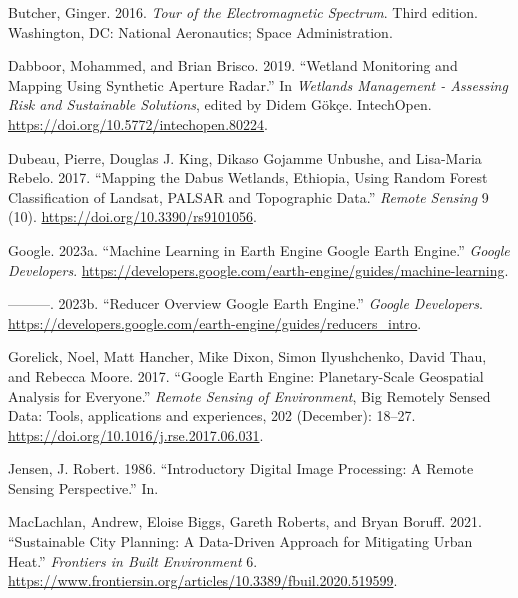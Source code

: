 \documentclass[
  letterpaper,
  DIV=11,
  numbers=noendperiod]{scrreprt}
\newlength{\cslhangindent}
\newlength{\cslentryspacingunit} %
\newenvironment{CSLReferences}[2] %
 {%
  \setlength{\parindent}{0pt}
  \ifodd #1
  \let\oldpar\par
  \def\par{\hangindent=\cslhangindent\oldpar}
  \fi
  \setlength{\parskip}{#2\cslentryspacingunit}
 }%
 {}
\begin{document}
\hypertarget{refs}{}
\begin{CSLReferences}{1}{0}
\leavevmode{}%
Butcher, Ginger. 2016. \emph{Tour of the Electromagnetic Spectrum}.
Third edition. Washington, DC: National Aeronautics; Space
Administration.

\leavevmode{}%
Dabboor, Mohammed, and Brian Brisco. 2019. {``Wetland {Monitoring} and
{Mapping} {Using} {Synthetic} {Aperture} {Radar}.''} In \emph{Wetlands
{Management} - {Assessing} {Risk} and {Sustainable} {Solutions}}, edited
by Didem Gökçe. IntechOpen.
\url{https://doi.org/10.5772/intechopen.80224}.

\leavevmode{}%
Dubeau, Pierre, Douglas J. King, Dikaso Gojamme Unbushe, and Lisa-Maria
Rebelo. 2017. {``Mapping the {Dabus} {Wetlands}, {Ethiopia}, {Using}
{Random} {Forest} {Classification} of {Landsat}, {PALSAR} and
{Topographic} {Data}.''} \emph{Remote Sensing} 9 (10).
\url{https://doi.org/10.3390/rs9101056}.

\leavevmode{}%
Google. 2023a. {``Machine {Learning} in {Earth} {Engine} {\textbar}
{Google} {Earth} {Engine}.''} \emph{Google Developers}.
\url{https://developers.google.com/earth-engine/guides/machine-learning}.

\leavevmode{}%
---------. 2023b. {``Reducer {Overview} {\textbar} {Google} {Earth}
{Engine}.''} \emph{Google Developers}.
\url{https://developers.google.com/earth-engine/guides/reducers_intro}.

\leavevmode{}%
Gorelick, Noel, Matt Hancher, Mike Dixon, Simon Ilyushchenko, David
Thau, and Rebecca Moore. 2017. {``Google {Earth} {Engine}:
{Planetary}-Scale Geospatial Analysis for Everyone.''} \emph{Remote
Sensing of Environment}, Big {Remotely} {Sensed} {Data}: Tools,
applications and experiences, 202 (December): 18--27.
\url{https://doi.org/10.1016/j.rse.2017.06.031}.

\leavevmode{}%
Jensen, J. Robert. 1986. {``Introductory Digital Image Processing: A
Remote Sensing Perspective.''} In.

\leavevmode{}%
MacLachlan, Andrew, Eloise Biggs, Gareth Roberts, and Bryan Boruff.
2021. {``Sustainable {City} {Planning}: {A} {Data}-{Driven} {Approach}
for {Mitigating} {Urban} {Heat}.''} \emph{Frontiers in Built
Environment} 6.
\url{https://www.frontiersin.org/articles/10.3389/fbuil.2020.519599}.


\end{CSLReferences}
\end{document}
